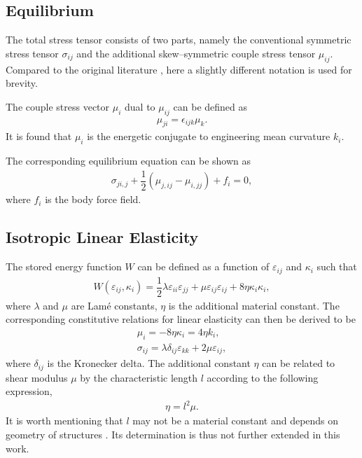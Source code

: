 \documentclass[3p,sort&compress,11pt,fleqn]{elsarticle}
\begin{document}
\subsection{Equilibrium}
The total stress tensor consists of two parts, namely the conventional symmetric stress tensor $\sigma_{ij}$ and the additional skew--symmetric couple stress tensor $\mu_{ij}$. Compared to the original literature \citep{Hadjesfandiari2011}, here a slightly different notation is used for brevity.

The couple stress vector $\mu_i$ dual to $\mu_{ij}$ can be defined as
\begin{gather}
\mu_{ji}=\epsilon_{ijk}\mu_k.
\end{gather}
It is found that $\mu_i$ is the energetic conjugate to engineering mean curvature $k_i$.

The corresponding equilibrium equation can be shown as
\begin{gather}\label{eq:equilibrium}
\sigma_{ji,j}+\dfrac{1}{2}\left(\mu_{j,ij}-\mu_{i,jj}\right)+f_i=0,
\end{gather}
where $f_i$ is the body force field.
\subsection{Isotropic Linear Elasticity}
The stored energy function $W$ can be defined as a function of $\varepsilon_{ij}$ and $\kappa_i$ such that
\begin{gather}\label{eq:stored_energy}
W\left(\varepsilon_{ij},\kappa_i\right)=\dfrac{1}{2}\lambda\varepsilon_{ii}\varepsilon_{jj}+\mu\varepsilon_{ij}\varepsilon_{ij}+8\eta\kappa_i\kappa_i,
\end{gather}
where $\lambda$ and $\mu$ are Lam\'{e} constants, $\eta$ is the additional material constant. The corresponding constitutive relations for linear elasticity can then be derived to be
\begin{gather}\label{eq:constitutive_couple}
\mu_i=-8\eta\kappa_i=4\eta{}k_i,\\
\sigma_{ij}=\lambda\delta_{ij}\varepsilon_{kk}+2\mu\varepsilon_{ij},
\end{gather}
where $\delta_{ij}$ is the Kronecker delta. The additional constant $\eta$ can be related to shear modulus $\mu$ by the characteristic length $l$ according to the following expression,
\begin{gather}
\eta=l^2\mu.
\end{gather}
It is worth mentioning that $l$ may not be a material constant and depends on geometry of structures \citep{Khorshidi2018}. Its determination is thus not further extended in this work.
\end{document}
